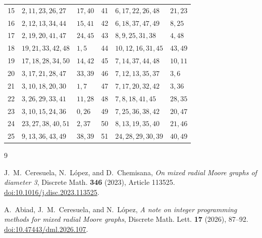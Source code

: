 \documentclass[11pt]{amsart}
\begin{document}
\begin{center}
\begin{tabular}{rll@{\qquad}rll}
15 & $2,11,23,26,27$ & $17,40$ & 41 & $6,17,22,26,48$ & $21,23$ \\
16 & $2,12,13,34,44$ & $15,41$ & 42 & $6,18,37,47,49$ & $8,25$ \\
17 & $2,19,20,41,47$ & $24,45$ & 43 & $8,9,25,31,38$ & $4,48$ \\
18 & $19,21,33,42,48$ & $1,5$ & 44 & $10,12,16,31,45$ & $43,49$ \\
19 & $17,18,28,34,50$ & $14,42$ & 45 & $7,14,37,44,48$ & $10,11$ \\
20 & $3,17,21,28,47$ & $33,39$ & 46 & $7,12,13,35,37$ & $3,6$ \\
21 & $3,10,18,20,30$ & $1,7$ & 47 & $7,17,20,32,42$ & $3,36$ \\
22 & $3,26,29,33,41$ & $11,28$ & 48 & $7,8,18,41,45$ & $28,35$ \\
23 & $3,10,15,24,36$ & $0,26$ & 49 & $7,25,36,38,42$ & $20,47$ \\
24 & $23,27,38,40,51$ & $2,37$ & 50 & $8,13,19,35,40$ & $21,46$ \\
25 & $9,13,36,43,49$ & $38,39$ & 51 & $24,28,29,30,39$ & $40,49$ \\
\bottomrule
\end{tabular}
\end{center}

\begin{thebibliography}{9}
\small

J.~M.~Ceresuela, N.~L\'opez, and D.~Chemisana,
\emph{On mixed radial Moore graphs of diameter 3},
Discrete Math. \textbf{346} (2023), Article 113525.
\href{https://doi.org/10.1016/j.disc.2023.113525}
{doi:10.1016/j.disc.2023.113525}.

A.~Abiad, J.~M.~Ceresuela, and N.~L\'opez,
\emph{A note on integer programming methods for mixed radial Moore graphs},
Discrete Math. Lett. \textbf{17} (2026), 87--92.
\href{https://doi.org/10.47443/dml.2026.107}
{doi:10.47443/dml.2026.107}.

\end{thebibliography}
\end{document}
